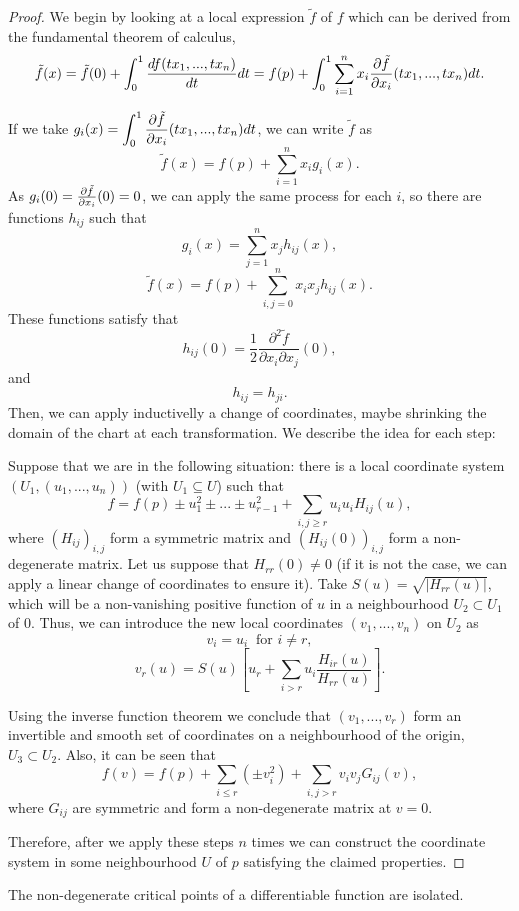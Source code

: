 \begin{proof} We begin by looking at a local expression $\tilde{f}$ of $f$ which can be derived from the fundamental theorem of calculus,
\[\tilde{f}(x) = \tilde{f}(0) + \int_0^1 \frac{df(tx_1,...,tx_n)}{dt} dt = f(p) + \int_0^1 \sum_{i=1}^n x_i \frac{\partial \tilde{f}}{\partial x_i}(tx_1,...,tx_n) dt .\]

If we take $g_i(x) = \displaystyle\int_0^1 \frac{\partial \tilde{f}}{\partial x_i}(tx_1,...,tx_n) dt$, we can write $\tilde{f}$ as
\[\tilde{f}(x) = f(p) + \sum_{i=1}^n x_i g_i(x) .\]
As $g_i(0) = \frac{\partial \tilde{f}}{\partial x_i}(0) = 0$, we can apply the same process for each $i$, so there are functions $h_{ij}$ such that
\[g_i(x) = \sum_{j=1}^n x_j h_{ij}(x) ,\]
\[\tilde{f}(x) = f(p) + \sum_{i,j=0}^n x_i x_j h_{ij}(x) .\]
These functions satisfy that
\[h_{ij}(0) = \frac12 \frac{\partial^2 \tilde{f}}{\partial x_i \partial x_j}(0) ,\]
and
\[h_{ij} = h_{ji} .\]
Then, we can apply inductivelly a change of coordinates, maybe shrinking the domain of the chart at each transformation. We describe the idea for each step:

Suppose that we are in the following situation: there is a local coordinate system $(U_1, (u_1,...,u_n))$ (with $U_1 \subseteq U$) such that
\[f = f(p) \pm u_1^2 \pm ... \pm u_{r-1}^2 + \sum_{i,j \geq r} u_i u_i H_{ij}(u) ,\]
where $(H_{ij})_{i,j}$ form a symmetric matrix and $(H_{ij}(0))_{i,j}$ form a non-degenerate matrix. Let us suppose that $H_{rr}(0) \neq 0$ (if it is not the case, we can apply a linear change of coordinates to ensure it). Take $S(u) = \sqrt{|H_{rr}(u)|}$, which will be a non-vanishing positive function of $u$ in a neighbourhood $U_2 \subset U_1$ of $0$. Thus, we can introduce the new local coordinates $(v_1,...,v_n)$ on $U_2$ as
\[v_i = u_i \ \text{ for } i \neq r,\]
\[v_r(u) = S(u) \left[ u_r + \sum_{i > r} u_i \frac{H_{ir}(u)}{H_{rr}(u)} \right] .\]

Using the inverse function theorem we conclude that $(v_1,...,v_r)$ form an invertible and smooth set of coordinates on a neighbourhood of the origin, $U_3 \subset U_2$. Also, it can be seen that
\[f(v) = f(p) + \sum_{i \leq r} \left(\pm v_i^2\right) + \sum_{i,j > r} v_i v_j G_{ij}(v) ,\]
where $G_{ij}$ are symmetric and form a non-degenerate matrix at $v = 0$.

Therefore, after we apply these steps $n$ times we can construct the coordinate system in some neighbourhood $U$ of $p$ satisfying the claimed properties.
\end{proof}

\begin{coro}
The non-degenerate critical points of  a differentiable function are isolated.
\end{coro}

